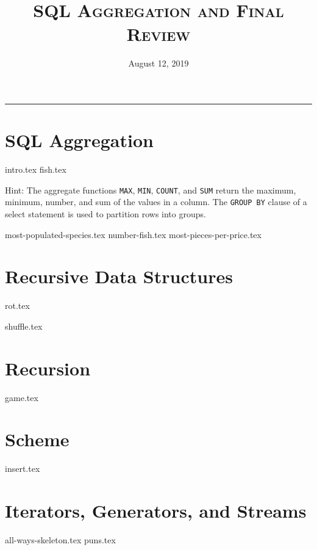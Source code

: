 \documentclass{exam}
\title{\textsc{SQL Aggregation and Final Review}}
\date{August 12, 2019}
\begin{document}
\maketitle
\rule{\textwidth}{0.15em}
\fontsize{12}{15}\selectfont


\section{SQL Aggregation}
{intro.tex}
{fish.tex}

Hint: The aggregate functions \texttt{MAX}, \texttt{MIN}, \texttt{COUNT}, and \texttt{SUM} return the maximum, minimum, number, and sum of the values in a column. The  \texttt{GROUP BY} clause of a select statement is used to partition rows into groups.

\newpage
\begin{questions}
{most-populated-species.tex}
{number-fish.tex}
{most-pieces-per-price.tex}
\end{questions}


\newpage
\section{Recursive Data Structures}
\begin{questions}
{rot.tex}

\newpage
{shuffle.tex}
\end{questions}

\newpage
\section{Recursion}
\begin{questions}
{game.tex}
\end{questions}

\newpage
\section{Scheme}
\begin{questions}
{insert.tex}
\end{questions}


\newpage
\section{Iterators, Generators, and Streams}

\begin{questions}
{all-ways-skeleton.tex}
\newpage
{puns.tex}
\end{questions}
\end{document}
